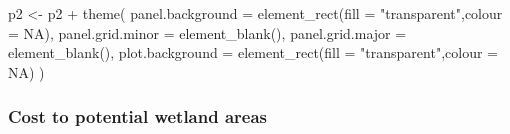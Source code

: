 \documentclass[
]{article}
\newenvironment{Shaded}{\begin{snugshade}}{\end{snugshade}}
\newcommand{\AttributeTok}[1]{\textcolor[rgb]{0.77,0.63,0.00}{#1}}
\newcommand{\ConstantTok}[1]{\textcolor[rgb]{0.00,0.00,0.00}{#1}}
\newcommand{\FunctionTok}[1]{\textcolor[rgb]{0.00,0.00,0.00}{#1}}
\newcommand{\NormalTok}[1]{#1}
\newcommand{\OtherTok}[1]{\textcolor[rgb]{0.56,0.35,0.01}{#1}}
\newcommand{\SpecialCharTok}[1]{\textcolor[rgb]{0.00,0.00,0.00}{#1}}
\newcommand{\StringTok}[1]{\textcolor[rgb]{0.31,0.60,0.02}{#1}}
\begin{document}
\begin{Shaded}
\begin{Highlighting}[]
\NormalTok{p2 }\OtherTok{\textless{}{-}}\NormalTok{ p2 }\SpecialCharTok{+} \FunctionTok{theme}\NormalTok{( }
  \AttributeTok{panel.background =} \FunctionTok{element\_rect}\NormalTok{(}\AttributeTok{fill =} \StringTok{"transparent"}\NormalTok{,}\AttributeTok{colour =} \ConstantTok{NA}\NormalTok{), }
  \AttributeTok{panel.grid.minor =} \FunctionTok{element\_blank}\NormalTok{(), }
  \AttributeTok{panel.grid.major =} \FunctionTok{element\_blank}\NormalTok{(), }
  \AttributeTok{plot.background =} \FunctionTok{element\_rect}\NormalTok{(}\AttributeTok{fill =} \StringTok{"transparent"}\NormalTok{,}\AttributeTok{colour =} \ConstantTok{NA}\NormalTok{) }
\NormalTok{)}
\end{Highlighting}
\end{Shaded}

\hypertarget{cost-to-potential-wetland-areas}{%
\subsubsection{Cost to potential wetland
areas}\label{cost-to-potential-wetland-areas}}
\end{document}
